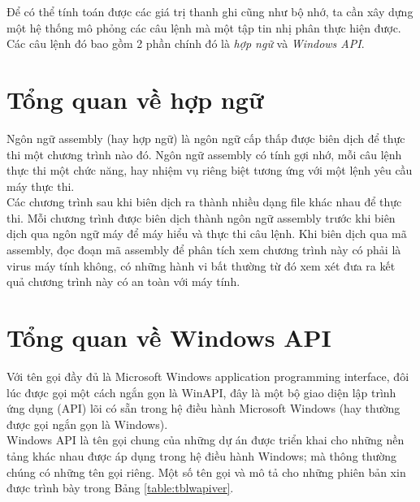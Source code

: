 Để có thể tính toán được các giá trị thanh ghi cũng như bộ nhớ, ta cần xây dựng một hệ thống mô phỏng các câu lệnh mà một tập tin nhị phân thực hiện được. Các câu lệnh đó bao gồm 2 phần chính đó là \textit{hợp ngữ} và \textit{Windows API}.

\section{Tổng quan về hợp ngữ}
Ngôn ngữ assembly (hay hợp ngữ) là ngôn ngữ cấp thấp được biên dịch để thực thi một chương trình nào đó. Ngôn ngữ assembly có tính gợi nhớ, mỗi câu lệnh thực thi một chức năng, hay nhiệm vụ riêng biệt tương ứng với một lệnh yêu cầu máy thực thi. \\

Các chương trình sau khi biên dịch ra thành nhiều dạng file khác nhau để thực thi. Mỗi chương trình được biên dịch thành ngôn ngữ assembly trước khi biên dịch qua ngôn ngữ máy để máy hiểu và thực thi câu lệnh. Khi biên dịch qua mã assembly, đọc đoạn mã assembly để phân tích xem chương trình này có phải là virus máy tính không, có những hành vi bất thường từ đó xem xét đưa ra kết quả chương trình này có an toàn với máy tính.

\section {Tổng quan về Windows API}

Với tên gọi đầy đủ là Microsoft Windows application programming interface, đôi lúc được gọi một cách ngắn gọn là WinAPI, đây là một bộ giao diện lập trình ứng dụng (API) lõi có sẵn trong hệ điều hành Microsoft Windows (hay thường được gọi ngắn gọn là Windows).\\

Windows API là tên gọi chung của những dự án được triển khai cho những nền tảng khác nhau được áp dụng trong hệ điều hành Windows; mà thông thường chúng có những tên gọi riêng. Một số tên gọi và mô tả cho những phiên bản xin được trình bày trong Bảng \ref{table:tblwapiver}.\\


